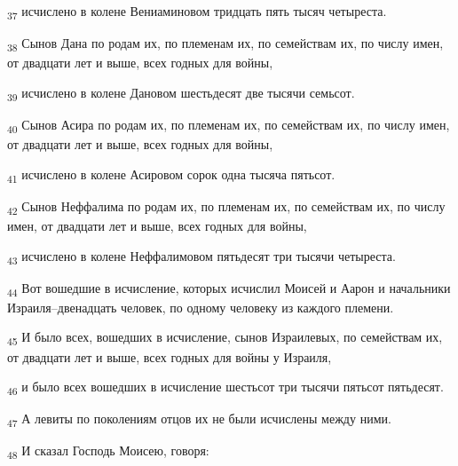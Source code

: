 \begin{tcolorbox}
\textsubscript{37} исчислено в колене Вениаминовом тридцать пять тысяч четыреста.
\end{tcolorbox}
\begin{tcolorbox}
\textsubscript{38} Сынов Дана по родам их, по племенам их, по семействам их, по числу имен, от двадцати лет и выше, всех годных для войны,
\end{tcolorbox}
\begin{tcolorbox}
\textsubscript{39} исчислено в колене Дановом шестьдесят две тысячи семьсот.
\end{tcolorbox}
\begin{tcolorbox}
\textsubscript{40} Сынов Асира по родам их, по племенам их, по семействам их, по числу имен, от двадцати лет и выше, всех годных для войны,
\end{tcolorbox}
\begin{tcolorbox}
\textsubscript{41} исчислено в колене Асировом сорок одна тысяча пятьсот.
\end{tcolorbox}
\begin{tcolorbox}
\textsubscript{42} Сынов Неффалима по родам их, по племенам их, по семействам их, по числу имен, от двадцати лет и выше, всех годных для войны,
\end{tcolorbox}
\begin{tcolorbox}
\textsubscript{43} исчислено в колене Неффалимовом пятьдесят три тысячи четыреста.
\end{tcolorbox}
\begin{tcolorbox}
\textsubscript{44} Вот вошедшие в исчисление, которых исчислил Моисей и Аарон и начальники Израиля--двенадцать человек, по одному человеку из каждого племени.
\end{tcolorbox}
\begin{tcolorbox}
\textsubscript{45} И было всех, вошедших в исчисление, сынов Израилевых, по семействам их, от двадцати лет и выше, всех годных для войны у Израиля,
\end{tcolorbox}
\begin{tcolorbox}
\textsubscript{46} и было всех вошедших в исчисление шестьсот три тысячи пятьсот пятьдесят.
\end{tcolorbox}
\begin{tcolorbox}
\textsubscript{47} А левиты по поколениям отцов их не были исчислены между ними.
\end{tcolorbox}
\begin{tcolorbox}
\textsubscript{48} И сказал Господь Моисею, говоря:
\end{tcolorbox}
